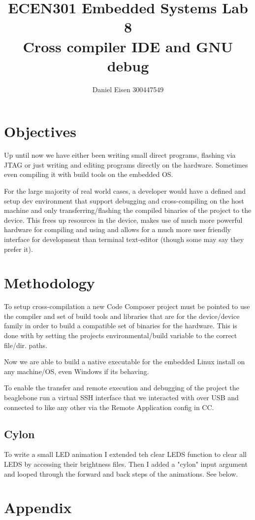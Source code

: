 \documentclass[11pt]{article}
\title{ECEN301 Embedded Systems Lab 8 \\ Cross compiler IDE and GNU debug}
\author{Daniel Eisen 300447549}
\begin{document}
\begin{preview}
    \maketitle
    \section{Objectives}
    Up until now we have either been writing small direct programs, flashing via JTAG or just writing and editing programs directly on the hardware. Sometimes even compiling it with build tools on the embedded OS.

    For the large majority of real world cases, a developer would have a defined and setup dev environment that support debugging and cross-compiling on the host machine and only transferring/flashing the compiled binaries of the project to the device. This frees up resources in the device, makes use of much more powerful hardware for compiling and using and allows for a much more user friendly interface for development than terminal text-editor (though some may say they prefer it).
    \section{Methodology}
    To setup cross-compilation a new Code Composer project must be pointed to use the compiler and set of build tools and libraries that are for the device/device family in order to build a compatible set of binaries for the hardware. This is done with by setting the projects environmental/build variable to the correct file/dir. paths.

    Now we are able to build a native executable for the embedded Linux install on any machine/OS, even Windows if its behaving.
    
    
    To enable the transfer and remote execution and debugging of the project the beaglebone run a virtual SSH interface that we interacted with over USB and connected to like any other via the Remote Application config in CC.
    
    \subsection{Cylon}
    To write a small LED animation I extended teh clear LEDS function to clear all LEDS by accessing their brightness files. Then I added a "cylon" input argument and looped through the forward and back steps of the animations.  See below.

    \section*{Appendix}
    
\end{preview}
\end{document}
